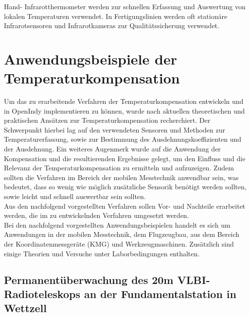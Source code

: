 Hand- Infrarotthermometer werden zur schnellen Erfassung und Auswertung von lokalen Temperaturen verwendet.
In Fertigungslinien werden oft stationäre Infrarotsensoren und Infrarotkameras zur Qualitätssicherung verwendet.

\chapter{Anwendungsbeispiele der Temperaturkompensation}\label{chap:anwendungen}

Um das zu erarbeitende Verfahren der Temperaturkompensation entwickeln und in OpenIndy implementieren zu können, wurde nach aktuellen theoretischen und praktischen Ansätzen zur Temperaturkompensation recherchiert. Der Schwerpunkt hierbei lag auf den verwendeten Sensoren und Methoden zur Temperaturerfassung, sowie zur Bestimmung des Ausdehnungskoeffizienten und der Ausdehnung. Ein weiteres Augenmerk wurde auf die Anwendung der Kompensation und die resultierenden Ergebnisse gelegt, um den Einfluss und die Relevanz der Temperaturkompensation zu ermitteln und aufzuzeigen. Zudem sollten die Verfahren im Bereich der mobilen Messtechnik anwendbar sein, was bedeutet, dass so wenig wie möglich zusätzliche Sensorik benötigt werden sollten, sowie leicht und schnell auswertbar sein sollten.\\ 
Aus den nachfolgend vorgestellten Verfahren sollen Vor- und Nachteile erarbeitet werden, die im zu entwickelnden Verfahren umgesetzt werden.\\
Bei den nachfolgend vorgestellten Anwendungsbeispielen handelt es sich um Anwendungen in der mobilen Messtechnik, dem Flugzeugbau, aus dem Bereich der Koordinatenmessgeräte (KMG) und Werkzeugmaschinen. Zusätzlich sind einige Theorien und Versuche unter Laborbedingungen enthalten.

\section{Permanentüberwachung des 20m VLBI- Radioteleskops an der Fundamentalstation in Wettzell}\label{sec:teleskop}

